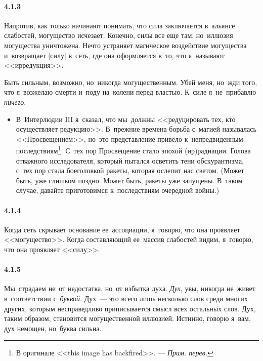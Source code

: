 \paragraph{4.1.3}\hypertarget{par:4.1.3}{} Напротив, как только начинают понимать, что сила заключается в~альянсе слабостей, могущество исчезает. Конечно, силы все еще там, но~иллюзия могущества уничтожена. Нечто устраняет магическое воздействие могущества и~возвращает [силу] в~сеть, где она оформляется в~то, что я~называют <<ирредукция>>. 

Быть сильным, возможно, но~никогда могущественным. Убей меня, но~жди того, что я~возжелаю смерти и~поду на~колени перед властью. К~силе я~не~прибавлю {\itshape ничего}.

	\begin{itemize}
	\item 
 В~Интерлюдии III я~сказал, что мы~должны <<редуцировать тех, кто осуществляет редукцию>>. В~прежние времена борьба с~магией называлась <<Просвещением>>, но~это представление привело к~непредвиденным последствиям\footnote{В оригинале <<this image has backfired>>. --- {\itshape Прим. перев.}}. С~тех пор Просвещение стало эпохой (ир)радиации. Голова отважного исследователя, который пытался осветить тени обскурантизма, с~тех пор стала боеголовкой ракеты, которая ослепит нас светом. (Может быть, уже слишком поздно. Может быть, ракеты уже запущены. В~таком случае, давайте приготовимся к~последствиям очередной войны.)
	\end{itemize}	


\paragraph{4.1.4}\hypertarget{par:4.1.4}{} Когда сеть скрывает основание ее~ассоциации, я~говорю, что она проявляет <<могущество>>. Когда составляющий ее~массив слабостей видим, я~говорю, что она проявляет <<силу>>.


\paragraph{4.1.5}\hypertarget{par:4.1.5}{} Мы~страдаем не~от недостатка, но~от избытка духа. {\itshape Дух}, увы, никогда не~живет в~соответствии с~{\itshape буквой}. Дух~--- это всего лишь несколько слов среди многих других, которым несправедливо приписывается смысл всех остальных слов. Дух, таким образом, становится могущественной иллюзией. Истинно, говорю я~вам, дух немощен, но~буква сильна.

